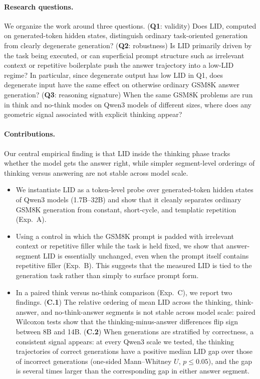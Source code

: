 \documentclass{article}
\theoremstyle{plain}
\theoremstyle{definition}
\theoremstyle{remark}
\begin{document}
\paragraph{Research questions.}
We organize the work around three questions. (\textbf{Q1}: validity) Does LID, computed on generated-token hidden states, distinguish ordinary task-oriented generation from clearly degenerate generation? (\textbf{Q2}: robustness) Is LID primarily driven by the task being executed, or can superficial prompt structure such as irrelevant context or repetitive boilerplate push the answer trajectory into a low-LID regime? In particular, since degenerate {output} has low LID in Q1, does degenerate {input} have the same effect on otherwise ordinary GSM8K answer generation? (\textbf{Q3}: reasoning signature) When the same GSM8K problems are run in think and no-think modes on Qwen3 models of different sizes, where does any geometric signal associated with explicit thinking appear?

\paragraph{Contributions.}
Our central empirical finding is that LID inside the thinking phase tracks {whether the model gets the answer right}, while simpler segment-level orderings of thinking versus answering are not stable across model scale.

\begin{itemize}
    \item We instantiate LID as a token-level probe over generated-token hidden states of Qwen3 models (1.7B--32B) and show that it cleanly separates ordinary GSM8K generation from constant, short-cycle, and templatic repetition (Exp.\ A).
    \item Using a control in which the GSM8K prompt is padded with irrelevant context or repetitive filler while the task is held fixed, we show that answer-segment LID is essentially unchanged, even when the prompt itself contains repetitive filler (Exp.\ B). This suggests that the measured LID is tied to the generation task rather than simply to surface prompt form.
    \item In a paired think versus no-think comparison (Exp.\ C), we report two findings. (\textbf{C.1}) The relative ordering of mean LID across the thinking, think-answer, and no-think-answer segments is {not} stable across model scale: paired Wilcoxon tests show that the thinking-minus-answer differences flip sign between 8B and 14B. (\textbf{C.2}) When generations are stratified by correctness, a consistent signal appears: at every Qwen3 scale we tested, the thinking trajectories of correct generations have a positive median LID gap over those of incorrect generations (one-sided Mann--Whitney $U$, $p\leq 0.05$), and the gap is several times larger than the corresponding gap in either answer segment.
\end{itemize}
\end{document}
